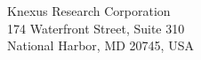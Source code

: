 \recipient
  {}
  {Knexus Research Corporation\\174 Waterfront Street, Suite 310\\National Harbor, MD 20745, USA}
